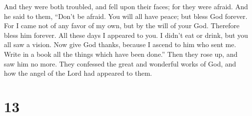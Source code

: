  And they were both troubled, and fell upon their faces;
for they were afraid.  And he said to them, ``Don't be
afraid. You will all have peace; but bless God forever. 
For I came not of any favor of my own, but by the will of your God.
Therefore bless him forever.  All these days I appeared
to you. I didn't eat or drink, but you all saw a vision. 
Now give God thanks, because I ascend to him who sent me. Write in a
book all the things which have been done.''  Then they
rose up, and saw him no more.  They confessed the great
and wonderful works of God, and how the angel of the Lord had appeared
to them.

\hypertarget{section-12}{%
\section{13}\label{section-12}}

